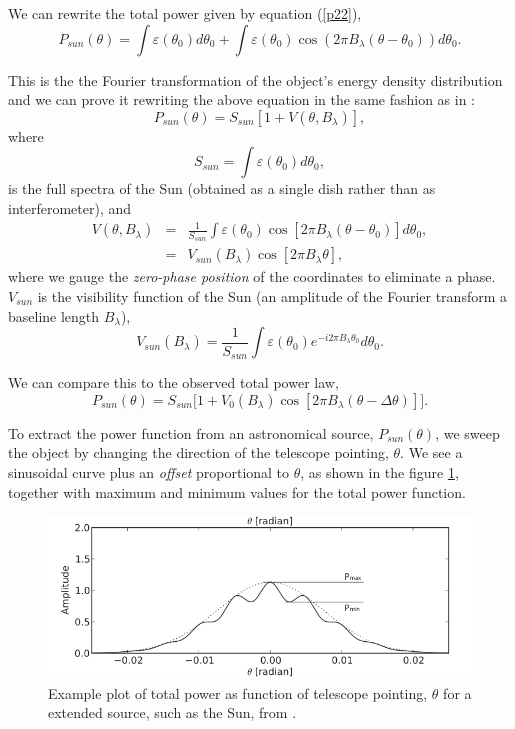 We can rewrite the total power given by equation (\ref{p22}),
$$ P_{sun}(\theta) = \int \varepsilon (\theta_0) d\theta_0 + \int \varepsilon (\theta_0) \cos (2\pi B_{\lambda} (\theta - \theta_0)) d\theta_0.$$

This is the the Fourier transformation of the object's energy density distribution and we can prove it rewriting the above equation in the same fashion as in \cite{sbu}:
$$P_{sun}(\theta) = S_{sun} [1+V(\theta,B_{\lambda})],$$
where
$$ S_{sun} = \int \varepsilon (\theta_0) d\theta_0,$$
is the full spectra of the Sun (obtained as a single dish rather than as interferometer), and
\begin{eqnarray}
V(\theta, B_{\lambda})&=& \frac{1}{S_{sun}} \int \varepsilon (\theta_0) \cos [2\pi B_{\lambda} (\theta-\theta_0)] d\theta_0 ,\nonumber \\
&=& V_{sun} (B_{\lambda}) \cos [2\pi B_{\lambda} \theta],
\end{eqnarray}
 where we gauge the {\it zero-phase position} of the coordinates to eliminate a phase. $V_{sun}$ is the visibility function of the Sun (an amplitude of the Fourier transform a baseline length $B_{\lambda}$),
\begin{equation}
V_{sun}(B_{\lambda}) = \frac{1}{S_{sun}} \int \varepsilon (\theta_0) e^{-i2\pi B_{\lambda} \theta_0}d\theta_0.
\end{equation}

We can compare this to the observed total power law,
$$P_{sun}(\theta) = S_{sun} \Big [1 + V_0(B_{\lambda}) \cos [2\pi B_{\lambda} (\theta - \Delta \theta)]\Big].$$

\bigskip

To extract the power function from an astronomical source, $P_{sun}(\theta)$, we sweep the object by changing the direction of the telescope pointing, $\theta$. We see a  sinusoidal curve plus an {\it offset} proportional to  $\theta$, as shown in the figure \ref{psun}, together with maximum and minimum values for the total power function.



\begin{figure}[htb]
\centering
 \includegraphics[scale=0.55]{figs/psun.png}
\caption{Example plot of total power as function of telescope pointing, $\theta$ for a extended source, such as the Sun, from \cite{sbu}. }
\label{psun}
\end{figure}

